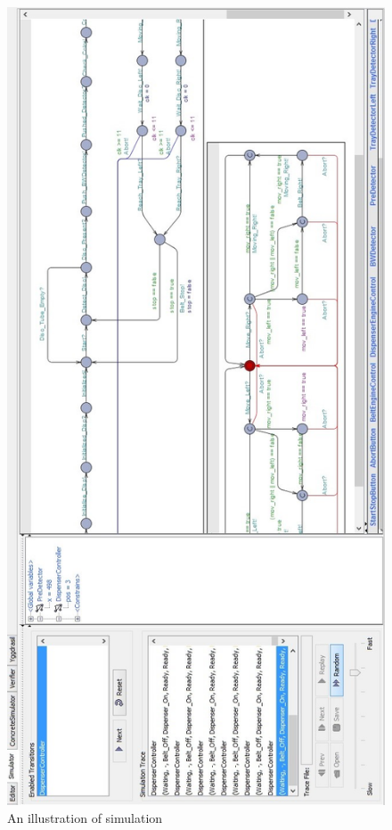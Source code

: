 \documentclass[a4paper,oneside,11pt]{report}
\begin{document}
\begin{figure}[htb]
\centering
\includegraphics[height=0.65\textheight]{images/statementcoverage.jpg}
\caption{An illustration of simulation}
\label{fig:statementcoverage}
\end{figure}
\end{document}
